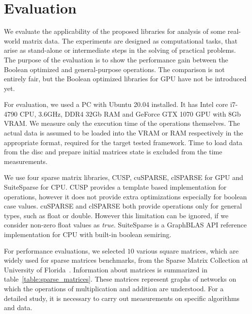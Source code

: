 \section{Evaluation}



We evaluate the applicability of the proposed libraries for analysis of some real-world matrix data.
The experiments are designed as computational tasks, that arise as stand-alone or intermediate steps in the solving of practical problems. 
The purpose of the evaluation is to show the performance gain between the Boolean optimized and general-purpose operations. 
The comparison is not entirely fair, but the Boolean optimized libraries for GPU have not be introduced yet.

For evaluation, we used a PC with Ubuntu 20.04 installed.
It has Intel core i7-4790 CPU, 3.6GHz, DDR4 32Gb RAM and GeForce GTX 1070 GPU with 8Gb VRAM.
We measure only the execution time of the operations themselves.
The actual data is assumed to be loaded into the VRAM or RAM respectively in the appropriate format, required for the target tested framework.
Time to load data from the disc and prepare initial matrices state is excluded from the time measurements.

We use four sparse matrix libraries, CUSP, cuSPARSE, clSPARSE for GPU and SuiteSparse for CPU.
CUSP provides a template based implementation for operations, however it does not provide extra optimizations especially for boolean case values. cuSPARSE and clSPARSE both provide operations only for general types, such as float or double.
However this limitation can be ignored, if we consider non-zero float values as \textit{true}.
SuiteSparse is a GraphBLAS API reference implementation for CPU with built-in boolean semiring.

For performance evaluations, we selected $10$ various square matrices, which are widely used for sparse matrices benchmarks, from the Sparse Matrix Collection at University of Florida~\cite{data:suitesparse_matrix_collection}.
Information about matrices is summarized in table~\ref{table:sparse_matrices}.
These matrices represent graphs of networks on which the operations of multiplication and addition are understood. 
For a detailed study, it is necessary to carry out measurements on specific algorithms and data. 

